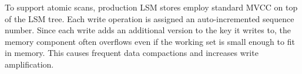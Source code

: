 To support atomic scans, production LSM stores employ standard MVCC on top of the LSM tree.  
Each write operation is assigned an auto-incremented sequence number. Since each write adds an additional version to the key it writes to, the memory component often overflows  even if the working set is small enough to fit in memory. This causes frequent data compactions and increases write amplification.



